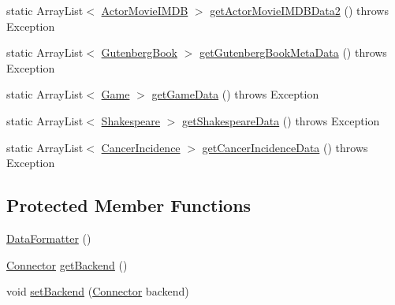 \begin{DoxyCompactItemize}
\item 
static Array\+List$<$ \mbox{\hyperlink{classbridges_1_1data__src__dependent_1_1_actor_movie_i_m_d_b}{Actor\+Movie\+I\+M\+DB}} $>$ \mbox{\hyperlink{classbridges_1_1connect_1_1_data_formatter_a9b599616c4d7a502f9fab8663173db6d}{get\+Actor\+Movie\+I\+M\+D\+B\+Data2}} ()  throws Exception 
\item 
static Array\+List$<$ \mbox{\hyperlink{classbridges_1_1data__src__dependent_1_1_gutenberg_book}{Gutenberg\+Book}} $>$ \mbox{\hyperlink{classbridges_1_1connect_1_1_data_formatter_a4bd21bd830238db40b511474afc77b61}{get\+Gutenberg\+Book\+Meta\+Data}} ()  throws Exception 
\item 
static Array\+List$<$ \mbox{\hyperlink{classbridges_1_1data__src__dependent_1_1_game}{Game}} $>$ \mbox{\hyperlink{classbridges_1_1connect_1_1_data_formatter_a4098317468be22b4284156d6cd2212e1}{get\+Game\+Data}} ()  throws Exception 
\item 
static Array\+List$<$ \mbox{\hyperlink{classbridges_1_1data__src__dependent_1_1_shakespeare}{Shakespeare}} $>$ \mbox{\hyperlink{classbridges_1_1connect_1_1_data_formatter_abc1db0f1a9758b5fa97c167cb8fe4052}{get\+Shakespeare\+Data}} ()  throws Exception 
\item 
static Array\+List$<$ \mbox{\hyperlink{classbridges_1_1data__src__dependent_1_1_cancer_incidence}{Cancer\+Incidence}} $>$ \mbox{\hyperlink{classbridges_1_1connect_1_1_data_formatter_af26cb09a93bf326fe14ad8fecf46b4f8}{get\+Cancer\+Incidence\+Data}} ()  throws Exception 
\end{DoxyCompactItemize}
\subsection*{Protected Member Functions}
\begin{DoxyCompactItemize}
\item 
\mbox{\hyperlink{classbridges_1_1connect_1_1_data_formatter_a31efd2251e98942e58e743dff213ef27}{Data\+Formatter}} ()
\item 
\mbox{\hyperlink{classbridges_1_1connect_1_1_connector}{Connector}} \mbox{\hyperlink{classbridges_1_1connect_1_1_data_formatter_a29cf4c2b0c5629d63a76b60569355c65}{get\+Backend}} ()
\item 
void \mbox{\hyperlink{classbridges_1_1connect_1_1_data_formatter_af9b878e5c092234a6ab5f8c11bee1fbd}{set\+Backend}} (\mbox{\hyperlink{classbridges_1_1connect_1_1_connector}{Connector}} backend)
\end{DoxyCompactItemize}


